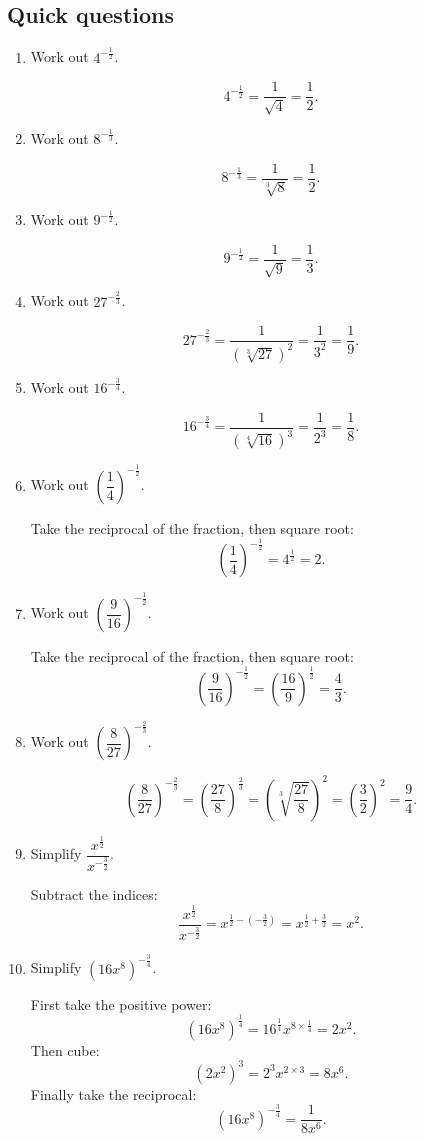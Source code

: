 \documentclass[11pt]{article}
\begin{document}
\subsection*{Quick questions}
\begin{enumerate}
\item Work out $4^{-\frac{1}{2}}$.

\[
4^{-\frac{1}{2}}=\frac{1}{\sqrt{4}}=\frac{1}{2}.
\]

\item Work out $8^{-\frac{1}{3}}$.

\[
8^{-\frac{1}{3}}=\frac{1}{\sqrt[3]{8}}=\frac{1}{2}.
\]

\item Work out $9^{-\frac{1}{2}}$.

\[
9^{-\frac{1}{2}}=\frac{1}{\sqrt{9}}=\frac{1}{3}.
\]

\item Work out $27^{-\frac{2}{3}}$.

\[
27^{-\frac{2}{3}}
=\frac{1}{\left(\sqrt[3]{27}\right)^2}
=\frac{1}{3^2}
=\frac{1}{9}.
\]

\item Work out $16^{-\frac{3}{4}}$.

\[
16^{-\frac{3}{4}}
=\frac{1}{\left(\sqrt[4]{16}\right)^3}
=\frac{1}{2^3}
=\frac{1}{8}.
\]

\item Work out $\left(\dfrac{1}{4}\right)^{-\frac{1}{2}}$.

Take the reciprocal of the fraction, then square root:
\[
\left(\frac{1}{4}\right)^{-\frac{1}{2}}
=4^{\frac{1}{2}}
=2.
\]

\item Work out $\left(\dfrac{9}{16}\right)^{-\frac{1}{2}}$.

Take the reciprocal of the fraction, then square root:
\[
\left(\frac{9}{16}\right)^{-\frac{1}{2}}
=\left(\frac{16}{9}\right)^{\frac{1}{2}}
=\frac{4}{3}.
\]

\item Work out $\left(\dfrac{8}{27}\right)^{-\frac{2}{3}}$.

\[
\left(\frac{8}{27}\right)^{-\frac{2}{3}}
=\left(\frac{27}{8}\right)^{\frac{2}{3}}
=\left(\sqrt[3]{\frac{27}{8}}\right)^2
=\left(\frac{3}{2}\right)^2
=\frac{9}{4}.
\]

\item Simplify $\dfrac{x^{\frac{1}{2}}}{x^{-\frac{3}{2}}}$.

Subtract the indices:
\[
\frac{x^{\frac{1}{2}}}{x^{-\frac{3}{2}}}
=x^{\frac{1}{2}-\left(-\frac{3}{2}\right)}
=x^{\frac{1}{2}+\frac{3}{2}}
=x^2.
\]

\item Simplify $\left(16x^8\right)^{-\frac{3}{4}}$.

First take the positive power:
\[
\left(16x^8\right)^{\frac{1}{4}}
=16^{\frac{1}{4}}x^{8\times\frac{1}{4}}
=2x^2.
\]
Then cube:
\[
\left(2x^2\right)^3=2^3x^{2\times3}=8x^6.
\]
Finally take the reciprocal:
\[
\left(16x^8\right)^{-\frac{3}{4}}
=\frac{1}{8x^6}.
\]
\end{enumerate}
\end{document}
